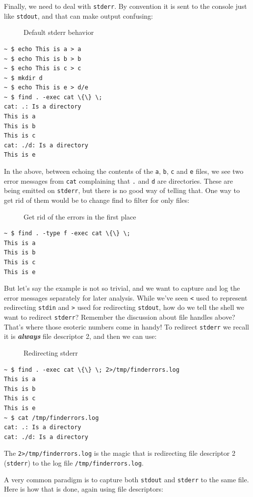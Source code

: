 \documentclass[10pt,]{book}
\numberwithin{figure}{chapter}
\DeclareRobustCommand{\drcap}[1]{\begin{figure}[H]\caption{#1}\end{figure}}
\begin{document}
Finally, we need to deal with \texttt{stderr}. By convention it is sent
to the console just like \texttt{stdout}, and that can make output
confusing:

\drcap{Default stderr behavior}

\begin{verbatim}
~ $ echo This is a > a
~ $ echo This is b > b
~ $ echo This is c > c
~ $ mkdir d
~ $ echo This is e > d/e
~ $ find . -exec cat \{\} \;
cat: .: Is a directory
This is a
This is b
This is c
cat: ./d: Is a directory
This is e
\end{verbatim}

In the above, between echoing the contents of the \texttt{a},
\texttt{b}, \texttt{c} and \texttt{e} files, we see two error messages
from \texttt{cat} complaining that \texttt{.} and \texttt{d} are
directories. These are being emitted on \texttt{stderr}, but there is no
good way of telling that. One way to get rid of them would be to change
find to filter for only files:

\drcap{Get rid of the errors in the first place}

\begin{verbatim}
~ $ find . -type f -exec cat \{\} \;
This is a
This is b
This is c
This is e
\end{verbatim}

But let's say the example is not so trivial, and we want to capture and
log the error messages separately for later analysis. While we've seen
\texttt{\textless{}} used to represent redirecting \texttt{stdin} and
\texttt{\textgreater{}} used for redirecting \texttt{stdout}, how do we
tell the shell we want to redirect \texttt{stderr}? Remember the
discussion about file handles above? That's where those esoteric numbers
come in handy! To redirect \texttt{stderr} we recall it is
\textbf{\emph{always}} file descriptor 2, and then we can use:

\drcap{Redirecting stderr}

\begin{verbatim}
~ $ find . -exec cat \{\} \; 2>/tmp/finderrors.log
This is a
This is b
This is c
This is e
~ $ cat /tmp/finderrors.log
cat: .: Is a directory
cat: ./d: Is a directory
\end{verbatim}

The \texttt{2\textgreater{}/tmp/finderrors.log} is the magic that is
redirecting file descriptor 2 (\texttt{stderr}) to the log file
\texttt{/tmp/finderrors.log}.

A very common paradigm is to capture both \texttt{stdout} and
\texttt{stderr} to the same file. Here is how that is done, again using
file descriptors:
\end{document}

